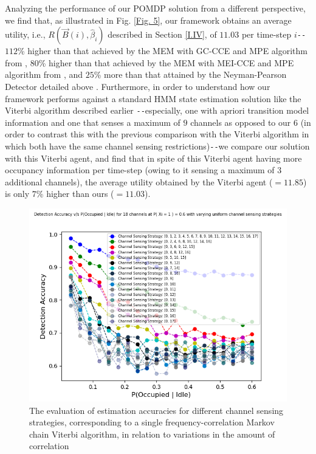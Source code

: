 \documentclass[12pt, draftcls, onecolumn]{IEEEtran}
\begin{document}
Analyzing the performance of our POMDP solution from a different perspective, we find that, as illustrated in Fig. \ref{Fig. 5}, our framework obtains an average utility, i.e., $R(\vec{B}(i),\hat{\beta}_{i})$ described in Section \ref{I.IV}, of $11.03$ per time-step $i$\texttt{-{}-} $112$\% higher than that achieved by the MEM with GC-CCE and MPE algorithm from \cite{WCL:7}, $80$\% higher than that achieved by the MEM with MEI-CCE and MPE algorithm from \cite{WCL:7}, and $25$\% more than that attained by the Neyman-Pearson Detector detailed above \cite{WCL:11}. Furthermore, in order to understand how our framework performs against a standard HMM state estimation solution like the Viterbi algorithm described earlier \cite{WCL:6}\texttt{-{}-}especially, one with apriori transition model information and one that senses a maximum of $9$ channels as opposed to our $6$ (in order to contrast this with the previous comparison with the Viterbi algorithm in which both have the same channel sensing restrictions)\texttt{-{}-}we compare our solution with this Viterbi agent, and find that in spite of this Viterbi agent having more occupancy information per time-step (owing to it sensing a maximum of $3$ additional channels), the average utility obtained by the Viterbi agent (${=}11.85$) is only $7$\% higher than ours (${=}11.03$).
\begin{figure} [htb]
    \centerline{
    \includegraphics[width = 1.0\textwidth]{Uniform_Channel_Sensing.png}}
    \caption{The evaluation of estimation accuracies for different channel sensing strategies, corresponding to a single frequency-correlation Markov chain Viterbi algorithm, in relation to variations in the amount of correlation}
    \label{Fig. 6}
\end{figure}
\end{document}
